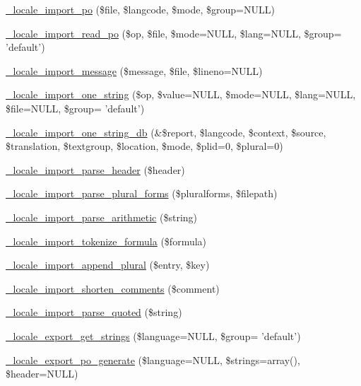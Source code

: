 \begin{DoxyCompactItemize}
\item 
\hyperlink{group__locale_ga5d3d163017bea9499839ef6be09807de}{\_\-locale\_\-import\_\-po} (\$file, \$langcode, \$mode, \$group=NULL)
\item 
\hyperlink{group__locale_ga97099fd0b115843fd4d443686a3ca35d}{\_\-locale\_\-import\_\-read\_\-po} (\$op, \$file, \$mode=NULL, \$lang=NULL, \$group= 'default')
\item 
\hyperlink{group__locale_gaa6bdc2dc6954e30cabefa65ca596e9d0}{\_\-locale\_\-import\_\-message} (\$message, \$file, \$lineno=NULL)
\item 
\hyperlink{group__locale_gac065dc774e2258493b661c45c455c709}{\_\-locale\_\-import\_\-one\_\-string} (\$op, \$value=NULL, \$mode=NULL, \$lang=NULL, \$file=NULL, \$group= 'default')
\item 
\hyperlink{group__locale_ga3f27e3894d1e98f2a0580834ebf51e4e}{\_\-locale\_\-import\_\-one\_\-string\_\-db} (\&\$report, \$langcode, \$context, \$source, \$translation, \$textgroup, \$location, \$mode, \$plid=0, \$plural=0)
\item 
\hyperlink{group__locale_ga1381fc54e922fe478d8ee5cfbe0c3c16}{\_\-locale\_\-import\_\-parse\_\-header} (\$header)
\item 
\hyperlink{group__locale_ga7693cf526c48e5dcb6dffabac7deb775}{\_\-locale\_\-import\_\-parse\_\-plural\_\-forms} (\$pluralforms, \$filepath)
\item 
\hyperlink{group__locale_gafec8dc8c1a6f8a0c70b5280c3a520c63}{\_\-locale\_\-import\_\-parse\_\-arithmetic} (\$string)
\item 
\hyperlink{group__locale_ga53c242ca7adfb5ccc25ebfedab8214a5}{\_\-locale\_\-import\_\-tokenize\_\-formula} (\$formula)
\item 
\hyperlink{group__locale_gad0abff75e696db162d5b90acda071371}{\_\-locale\_\-import\_\-append\_\-plural} (\$entry, \$key)
\item 
\hyperlink{group__locale_ga1cba05a4c159b1ed844f18ba484cc8e7}{\_\-locale\_\-import\_\-shorten\_\-comments} (\$comment)
\item 
\hyperlink{group__locale_gaac1954e79c57539b5599ff4ed7379df7}{\_\-locale\_\-import\_\-parse\_\-quoted} (\$string)
\item 
\hyperlink{group__locale_gade17be27a5240ba4804dc51eccf40246}{\_\-locale\_\-export\_\-get\_\-strings} (\$language=NULL, \$group= 'default')
\item 
\hyperlink{group__locale_ga694b7e78936d2875e18ef4c8171b7eb8}{\_\-locale\_\-export\_\-po\_\-generate} (\$language=NULL, \$strings=array(), \$header=NULL)

\end{DoxyCompactItemize}
